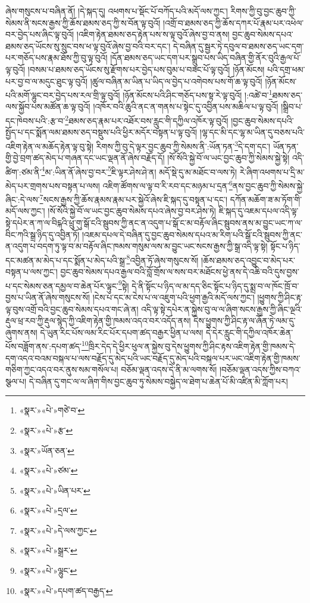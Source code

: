 ཞེས་གསུངས་པ་བཞིན་ནོ། །དེ་སྐད་དུ། འཕགས་པ་སྡོང་པོ་བཀོད་པའི་མདོ་ལས་ཀྱང་། རིགས་ཀྱི་བུ་བྱང་ཆུབ་ཀྱི་སེམས་ནི་སངས་རྒྱས་ཀྱི་ཆོས་ཐམས་ཅད་ཀྱི་ས་བོན་ལྟ་བུའོ། །འགྲོ་བ་ཐམས་ཅད་ཀྱི་ཆོས་དཀར་པོ་རྣམ་པར་འཕེལ་བར་བྱེད་པས་ཞིང་ལྟ་བུའོ། །འཇིག་རྟེན་ཐམས་ཅད་རྟེན་པས་ས་ལྟ་བུའོ་ཞེས་བྱ་བ་ནས། བྱང་ཆུབ་སེམས་དཔའ་ཐམས་ཅད་ཡོངས་སུ་སྲུང་བས་ཕ་ལྟ་བུའོ་ཞེས་བྱ་བའི་བར་དང་། དེ་བཞིན་དུ་སྦྱར་ཏེ་དབུལ་བ་ཐམས་ཅད་ཡང་དག་པར་གཅོད་པས་རྣམ་ཐོས་ཀྱི་བུ་ལྟ་བུའོ། །དོན་ཐམས་ཅད་ཡང་དག་པར་སྒྲུབ་པས་ཡིད་བཞིན་གྱི་ནོར་བུའི་རྒྱལ་པོ་ལྟ་བུའོ། །བསམ་པ་ཐམས་ཅད་ཡོངས་སུ་རྫོགས་པར་བྱེད་པས་བུམ་པ་བཟང་པོ་ལྟ་བུའོ། །ཉོན་མོངས། པའི་དགྲ་ཕམ་པར་བྱ་བ་ལ་མདུང་ཐུང་ལྟ་བུའོ། །ཚུལ་བཞིན་མ་ཡིན་པ་ཡིད་ལ་བྱེད་པ་འགེབས་པས་གོ་ཆ་ལྟ་བུའོ། །ཉོན་མོངས་པའི་མགོ་ལྷུང་བར་བྱེད་པས་རལ་གྲི་ལྟ་བུའོ། །ཉོན་མོངས་པའི་ཤིང་གཅོད་པས་སྟ་རེ་ལྟ་བུའོ། །:འཚེ་བ་\footnote{«སྣར་»«པེ་»གཙེ་བ་}ཐམས་ཅད་ལས་སྐྱོབ་པས་མཚོན་ཆ་ལྟ་བུའོ། །འཁོར་བའི་ཆུའི་ནང་ན་གནས་པ་སྟེང་དུ་འབྱིན་པས་མཆིལ་པ་ལྟ་བུའོ། །སྒྲིབ་པ་དང་ཁེབས་པའི་:རྩ་བ་\footnote{«སྣར་»«པེ་»རྩ་}ཐམས་ཅད་རྣམ་པར་འཐོར་བས་རླུང་གི་དཀྱིལ་འཁོར་ལྟ་བུའོ། །བྱང་ཆུབ་སེམས་དཔའི་སྤྱོད་པ་དང་སྨོན་ལམ་ཐམས་ཅད་བསྡུས་པའི་ཕྱིར་མདོར་བསྟན་པ་ལྟ་བུའོ། །ལྷ་དང་མི་དང་ལྷ་མ་ཡིན་དུ་བཅས་པའི་འཇིག་རྟེན་ལ་མཆོད་རྟེན་ལྟ་བུ་སྟེ། རིགས་ཀྱི་བུ་དེ་ལྟར་བྱང་ཆུབ་ཀྱི་སེམས་ནི་:ཡོན་ཏན་\footnote{«སྣར་»ཡོན་ཅན་}དེ་དག་དང་། ཡོན་ཏན་གྱི་བྱེ་བྲག་ཚད་མེད་པ་གཞན་དང་ཡང་ལྡན་ནོ་ཞེས་བརྗོད་དོ། །སོ་སོའི་སྐྱེ་བོ་ལ་ཡང་བྱང་ཆུབ་ཀྱི་སེམས་སྐྱེ་སྟེ། འདི་ཚིག་:ཙམ་ནི་\footnote{«སྣར་»«པེ་»ཙམ་}མ་:ཡིན་ནོ་ཞེས་བྱ་བར་\footnote{«སྣར་»«པེ་»ཡིན་པར་}ཇི་ལྟར་ཤེས་ཤེ་ན། མདོ་སྡེ་དུ་མ་མཐོང་བ་ལས་ཏེ། རེ་ཞིག་འཕགས་པ་དྲི་མ་མེད་པར་གྲགས་པས་བསྟན་པ་ལས། འཇིག་ཚོགས་ལ་ལྟ་བ་རི་རབ་དང་མཉམ་པ་དྲན་\footnote{«སྣར་»«པེ་»དྲལ་}ནས་བྱང་ཆུབ་ཀྱི་སེམས་སྐྱེ་ཞིང་:དེ་ལས་\footnote{«སྣར་»«པེ་»དེ་ལས་ཀྱང་}སངས་རྒྱས་ཀྱི་ཆོས་རྣམས་རྣམ་པར་སྐྱེའོ་ཞེས་ཇི་སྐད་དུ་བསྟན་པ་དང་། དཀོན་མཆོག་ཟ་མ་ཏོག་གི་མདོ་ལས་ཀྱང་། །སོ་སོའི་སྐྱེ་བོ་ལ་ཡང་བྱང་ཆུབ་སེམས་དཔའ་ཞེས་བྱ་བར་ཤེས་ཏེ། ཇི་སྐད་དུ་འཇམ་དཔལ་འདི་ལྟ་སྟེ་དཔེར་ན་ཀ་ལ་བིངྐའི་ཕྲུ་གུ་སྒོ་ངའི་སྦུབས་ཀྱི་ནང་ན་འདུག་པ་སྒོ་ང་མ་བརྟོལ་ཞིང་སྦུབས་ནས་མ་བྱུང་ཡང་ཀ་ལ་བིང་ཀའི་སྒྲ་ཉིད་དུ་འབྱིན་ཏོ། །འཇམ་དཔལ་དེ་བཞིན་དུ་བྱང་ཆུབ་སེམས་དཔའ་མ་རིག་པའི་སྒོ་ངའི་སྦུབས་ཀྱི་ནང་ན་འདུག་པ་བདག་ཏུ་ལྟ་བ་མ་བརྟོལ་ཞིང་ཁམས་གསུམ་ལས་མ་བྱུང་ཡང་སངས་རྒྱས་ཀྱི་སྒྲ་འདི་ལྟ་སྟེ། སྟོང་པ་ཉིད་དང་མཚན་མ་མེད་པ་དང་སྨོན་པ་མེད་པའི་སྒྲ་\footnote{«སྣར་»«པེ་»སྒྲར་}འབྱིན་ཏོ་ཞེས་གསུངས་སོ། །ཆོས་ཐམས་ཅད་འབྱུང་བ་མེད་པར་བསྟན་པ་ལས་ཀྱང་། བྱང་ཆུབ་སེམས་དཔའ་རྒྱལ་བའི་བློ་གྲོས་ལ་སས་བར་མཐོངས་ཕྱེ་ནས་དེ་འཆི་བའི་དུས་བྱས་པ་དང་སེམས་ཅན་དམྱལ་བ་ཆེན་པོར་ལྟུང་\footnote{«སྣར་»«པེ་»ལྷུང་}སྟེ། དེ་ནི་སྟོང་པ་ཉིད་ལ་མ་དད་ཅིང་སྟོང་པ་ཉིད་དུ་སྨྲ་བ་ལ་ཁོང་ཁྲོ་བ་བྱས་པ་ཡིན་ནོ་ཞེས་གསུངས་སོ། །ངེས་པ་དང་མ་ངེས་པ་ལ་འཇུག་པའི་ཕྱག་རྒྱའི་མདོ་ལས་ཀྱང་། །ཕྱུགས་ཀྱི་ཤིང་རྟ་ལྟ་བུས་འགྲོ་བའི་བྱང་ཆུབ་སེམས་དཔའ་གང་ཞེ་ན། འདི་ལྟ་སྟེ་དཔེར་ན་སྐྱེས་བུ་ལ་ལ་ཞིག་སངས་རྒྱས་ཀྱི་ཞིང་ལྔའི་རྡུལ་ཕྲ་རབ་ཀྱི་རྡུལ་སྙེད་ཀྱི་འཇིག་རྟེན་གྱི་ཁམས་འདའ་བར་འདོད་ནས། དེས་ཕྱུགས་ཀྱི་ཤིང་རྟ་ལ་ཞོན་ཏེ་ལམ་དུ་ཞུགས་ནས། དེ་ཡུན་རིང་པོས་ལམ་རིང་པོར་དཔག་ཚད་བརྒྱར་ཕྱིན་པ་ལས། དེ་དེར་རླུང་གི་དཀྱིལ་འཁོར་ཆེན་པོས་བཟློག་ནས་:དཔག་ཚད་\footnote{«སྣར་»«པེ་»དཔག་ཚད་བརྒྱད་}ཁྲིར་དེད་དེ་ཕྱིར་ཕུལ་ན་སྐྱེས་བུ་དེས་ཕྱུགས་ཀྱི་ཤིང་རྟས་འཇིག་རྟེན་གྱི་ཁམས་དེ་དག་འདའ་བའམ་བསྐལ་པ་ལས་བརྗོད་དུ་མེད་པའི་ཡང་བརྗོད་དུ་མེད་པའི་བསྐལ་པར་ཡང་འཇིག་རྟེན་གྱི་ཁམས་གཅིག་ཀྱང་འདའ་བར་ནུས་སམ་གསོལ་པ། བཅོམ་ལྡན་འདས་དེ་ནི་མ་ལགས་སོ། །བཅོམ་ལྡན་འདས་ཀྱིས་བཀའ་སྩལ་པ། དེ་བཞིན་དུ་གང་ལ་ལ་ཞིག་གིས་བྱང་ཆུབ་ཏུ་སེམས་བསྐྱེད་ལ་ཐེག་པ་ཆེན་པོ་མི་འཛིན་མི་ཀློག་པར། 